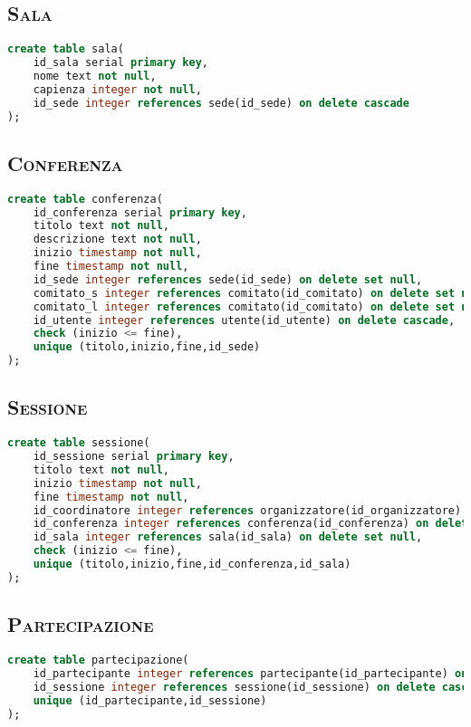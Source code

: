 \subsection{\textsc{Sala}}
\begin{lstlisting}[language=SQL,style=mystyle,caption={Tabella: Sala}]
create table sala(
    id_sala serial primary key,
    nome text not null,
    capienza integer not null,
    id_sede integer references sede(id_sede) on delete cascade
);
\end{lstlisting}
\subsection{\textsc{Conferenza}}
\begin{lstlisting}[language=SQL,style=mystyle, caption={Tabella: Conferenza}]
create table conferenza(
    id_conferenza serial primary key,
    titolo text not null,
    descrizione text not null,
    inizio timestamp not null,
    fine timestamp not null,
    id_sede integer references sede(id_sede) on delete set null,
    comitato_s integer references comitato(id_comitato) on delete set null,
    comitato_l integer references comitato(id_comitato) on delete set null,
    id_utente integer references utente(id_utente) on delete cascade,
    check (inizio <= fine),
    unique (titolo,inizio,fine,id_sede)
);
\end{lstlisting}
\subsection{\textsc{Sessione}}
\begin{lstlisting}[language=SQL,style=mystyle, caption={Tabella: Sessione}]
create table sessione(
    id_sessione serial primary key,
    titolo text not null,
    inizio timestamp not null,
    fine timestamp not null,
    id_coordinatore integer references organizzatore(id_organizzatore) on delete set null,
    id_conferenza integer references conferenza(id_conferenza) on delete cascade,
    id_sala integer references sala(id_sala) on delete set null,
    check (inizio <= fine),
    unique (titolo,inizio,fine,id_conferenza,id_sala)
);
\end{lstlisting}
\subsection{\textsc{Partecipazione}}
\begin{lstlisting}[language=SQL,style=mystyle, caption={Tabella: Partecipazione}]
create table partecipazione(
    id_partecipante integer references partecipante(id_partecipante) on delete cascade,
    id_sessione integer references sessione(id_sessione) on delete cascade,
    unique (id_partecipante,id_sessione) 
);
\end{lstlisting}
